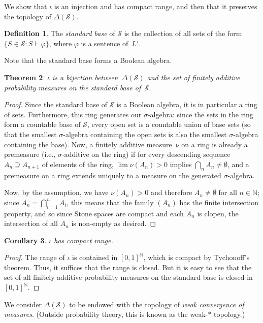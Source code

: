 \documentclass[12pt]{article}
\newcommand{\vp}{\varphi}
\newcommand{\NN}{\mathbb{N}}
\newcommand{\cL}{L'}
\newcommand{\cS}{\mathcal{S}}
\theoremstyle{plain}
\newtheorem{theorem}{Theorem}[subsection]
\newtheorem{corollary}[theorem]{Corollary}
\theoremstyle{definition}
\newtheorem{definition}[theorem]{Definition}
\theoremstyle{remark}
\begin{document}
We show that $\iota$ is an injection and has compact range, and then that it preserves the topology of $\Delta(\cS)$.
\begin{definition}
The \emph{standard base} of $\cS$ is the collection of all sets of the form $\{S\in\cS : S\vdash\vp\}$, where $\vp$ is a sentence of~$\cL$.
\end{definition}
Note that the standard base forms a Boolean algebra.
\begin{theorem}
$\iota$ is a bijection between~$\Delta(\cS)$ and the set of finitely additive probability measures on the standard base of~$\cS$.
\end{theorem}
\begin{proof}
Since the standard base of $\cS$ is a Boolean algebra, it is in particular a ring of sets. Furthermore, this ring generates our $\sigma$-algebra: since the sets in the ring form a countable base of $\cS$, every open set is a countable union of base sets (so that the smallest $\sigma$-algebra containing the open sets is also the smallest $\sigma$-algebra containing the base).
Now, a finitely additive measure~$\nu$ on a ring is already a premeasure (i.e., $\sigma$-additive on the ring) if for every descending sequence $A_n\supseteq A_{n+1}$ of elements of the ring, $\lim \nu(A_n) > 0$ implies $\textstyle\bigcap_n A_n \neq\emptyset$, and a premeasure on a ring extends uniquely to a measure on the generated $\sigma$-algebra. 

Now, by the assumption, we have $\nu(A_n) > 0$ and therefore $A_n\neq\emptyset$ for all $n\in\mathbb{N}$; since $\textstyle A_n = \bigcap_{i=1}^n A_i$, this means that the family $(A_n)$ has the finite intersection property, and so since Stone spaces are compact and each $A_n$ is clopen, the intersection of all $A_n$ is non-empty as desired.
\end{proof}
\begin{corollary}
$\iota$ has compact range.
\end{corollary}
\begin{proof}
The range of $\iota$ is contained in $[0,1]^\NN$, which is compact by Tychonoff's theorem. Thus, it suffices that the range is closed. But it is easy to see that the set of all finitely additive probability measures on the standard base is closed in $[0,1]^\NN$.
\end{proof}
We consider $\Delta(\cS)$ to be endowed with the topology of \emph{weak convergence of measures}. (Outside probability theory, this is known as the weak-$*$ topology.)
\end{document}
